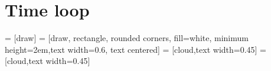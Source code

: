 \documentclass[12pt]{beamer}
\begin{document}
\section{Time loop}
\newcommand\eqbox[2]{\small #1:\\{\scriptsize #2}}
\begin{frame}[fragile]
  \tiny
   = [draw]
   = [draw, rectangle, rounded corners,
  fill=white, minimum height=2em,text width=0.6\textwidth, text centered]
   = [cloud,text width=0.45\textwidth]
   = [cloud,text width=0.45\textwidth]


\end{frame}
\end{document}
